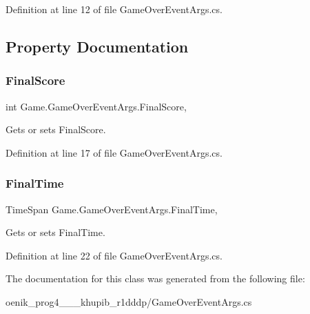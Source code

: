 Definition at line 12 of file Game\+Over\+Event\+Args.\+cs.



\subsection{Property Documentation}
\mbox{\label{class_game_1_1_game_over_event_args_a33e39edb9b10bad5fae08e89ac7d140d}} 
\subsubsection{\texorpdfstring{FinalScore}{FinalScore}}
{\footnotesize\ttfamily int Game.\+Game\+Over\+Event\+Args.\+Final\+Score\hspace{0.3cm}{\ttfamily [get]}, {\ttfamily [set]}}



Gets or sets Final\+Score. 



Definition at line 17 of file Game\+Over\+Event\+Args.\+cs.

\mbox{\label{class_game_1_1_game_over_event_args_af5fe5cd1376d05801b41a1c75626ee0d}} 
\subsubsection{\texorpdfstring{FinalTime}{FinalTime}}
{\footnotesize\ttfamily Time\+Span Game.\+Game\+Over\+Event\+Args.\+Final\+Time\hspace{0.3cm}{\ttfamily [get]}, {\ttfamily [set]}}



Gets or sets Final\+Time. 



Definition at line 22 of file Game\+Over\+Event\+Args.\+cs.



The documentation for this class was generated from the following file\+:\begin{DoxyCompactItemize}
\item 
oenik\+\_\+prog4\+\_\+\_\+\_\+khupib\+\_\+r1dddp/Game\+Over\+Event\+Args.\+cs\end{DoxyCompactItemize}
